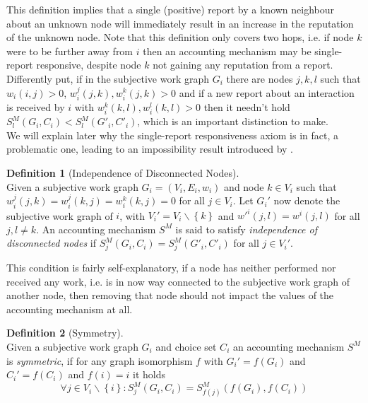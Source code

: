 \documentclass[11pt,a4paper]{report}
\theoremstyle{definition}
\newtheorem{definition}{Definition}[section]
\theoremstyle{theorem}
\theoremstyle{proposition}
\theoremstyle{corollary}
\theoremstyle{lemma}
\theoremstyle{example}
\theoremstyle{remark}
\begin{document}
\noindent{}This definition implies that a single (positive) report by a known neighbour about an unknown node will immediately result in an increase in the reputation of the unknown node. Note that this definition only covers two hops, i.e. if node $k$ were to be further away from $i$ then an accounting mechanism may be single-report responsive, despite node $k$ not gaining any reputation from a report. Differently put, if in the subjective work graph $G_i$ there are nodes $j,k,l$ such that $w_i(i,j)>0$, $w_i^j(j,k),w_i^k(j,k)>0$ and if a new report about an interaction is received by $i$ with $w_i^k(k,l),w_i^l(k,l)>0$ then it needn't hold $S^M_l(G_i,C_i) < S^M_l(G'_i,C'_i)$, which is an important distinction to make. \vspace{1em}\\

\noindent{}We will explain later why the single-report responsiveness axiom is in fact, a problematic one, leading to an impossibility result introduced by \cite{On the Sybil-Proofness of Accounting Mechanisms}. 

\begin{definition}[Independence of Disconnected Nodes]\ \\
Given a subjective work graph $G_i=(V_i,E_i,w_i)$ and node $k\in{}V_i$ such that $w_i^j(j,k)=w_i^j(k,j)=w_i^k(k,j)=0$ for all $j\in{}V_i$. Let $G_i'$ now denote the subjective work graph of $i$, with $V_i'=V_i\backslash{}\left\lbrace{}k\right\rbrace$ and $w'^i(j,l)=w^i(j,l)$ for all $j,l\neq{}k$. An accounting mechanism $S^M$ is said to satisfy {\it independence of disconnected nodes} if $S^M_j(G_i,C_i)=S^M_j(G'_i,C'_i)$ for all $j\in{}V_i'$.  
\end{definition}

\noindent{}This condition is fairly self-explanatory, if a node has neither performed nor received any work, i.e. is in now way connected to the subjective work graph of another node, then removing that node should not impact the values of the accounting mechanism at all. 

\begin{definition}[Symmetry]\ \\
Given a subjective work graph $G_i$ and choice set $C_i$ an accounting mechanism $S^M$ is {\it symmetric}, if for any graph isomorphism $f$
with $G_i'=f(G_i)$ and $C_i'=f(C_i)$ and $f(i)=i$ it holds
\[
\forall{}j\in{}V_i\backslash\left\lbrace{}i\right\rbrace: S^M_j(G_i,C_i)=S^M_{f(j)}(f(G_i),f(C_i))
\]
\end{definition}
\end{document}

